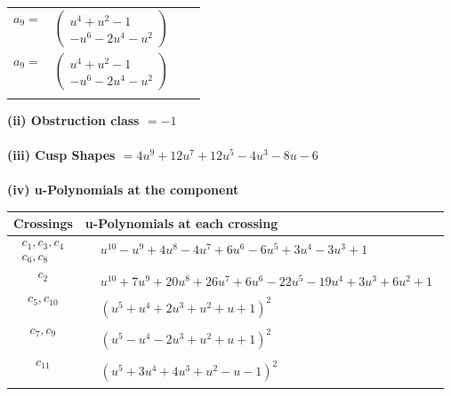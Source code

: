 \documentclass[1p]{elsarticle_modified}
\theoremstyle{definition}
\begin{document}
\begin{tabular}{m{7pt} m{180pt} m{7pt} m{180pt} }
\flushright $a_{9}=$&$\begin{pmatrix}u^4+u^2-1\\- u^6-2 u^4- u^2\end{pmatrix}$\\ \flushright $a_{9}=$&$\begin{pmatrix}u^4+u^2-1\\- u^6-2 u^4- u^2\end{pmatrix}$\\&\end{tabular}
\flushleft \textbf{(ii) Obstruction class $= -1$}\\~\\
\flushleft \textbf{(iii) Cusp Shapes $= 4 u^9+12 u^7+12 u^5-4 u^3-8 u-6$}\\~\\
\newpage\renewcommand{\arraystretch}{1}
\flushleft \textbf{(iv) u-Polynomials at the component}\newline \\
\begin{tabular}{m{50pt}|m{274pt}}
Crossings & \hspace{64pt}u-Polynomials at each crossing \\
\hline $$\begin{aligned}c_{1},c_{3},c_{4}\\c_{6},c_{8}\end{aligned}$$&$\begin{aligned}
&u^{10}- u^9+4 u^8-4 u^7+6 u^6-6 u^5+3 u^4-3 u^3+1
\end{aligned}$\\
\hline $$\begin{aligned}c_{2}\end{aligned}$$&$\begin{aligned}
&u^{10}+7 u^9+20 u^8+26 u^7+6 u^6-22 u^5-19 u^4+3 u^3+6 u^2+1
\end{aligned}$\\
\hline $$\begin{aligned}c_{5},c_{10}\end{aligned}$$&$\begin{aligned}
&(u^5+u^4+2 u^3+u^2+u+1)^2
\end{aligned}$\\
\hline $$\begin{aligned}c_{7},c_{9}\end{aligned}$$&$\begin{aligned}
&(u^5- u^4-2 u^3+u^2+u+1)^2
\end{aligned}$\\
\hline $$\begin{aligned}c_{11}\end{aligned}$$&$\begin{aligned}
&(u^5+3 u^4+4 u^3+u^2- u-1)^2
\end{aligned}$\\
\hline
\end{tabular}\\~\\
\end{document}
